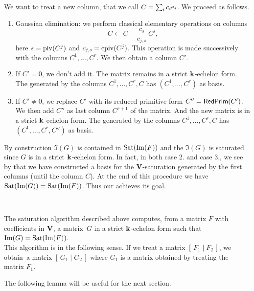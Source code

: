 We want to treat a new  column, that we call $C=\sum_i c_i\mathrm{e}_i$.
We proceed as follows.
%
\begin{enumerate}
%
\item  Gaussian elimination:  we perform classical elementary operations on  columns
  $$
  C\leftarrow C- \frac{c_s}{c_{j,s}}\,C^j,
  $$
here $s=\mathrm{piv}(C^j)$
and $c_{j,s}=\mathrm{cpiv}(C^j)$.
This operation is made  successively with the columns $C^1,\dots,C^r$.
We then obtain a column $C'$.
%
\item If $C'=0$, we don't add it.
The matrix remains in a strict   $\mathbf{k}$-echelon form.
The \Kev generated by the columns $C^1,\dots,C^r,C$ has $(C^1,\dots,C^r)$ as basis.
%
\item If $C'\neq 0$, we replace $C'$ with its reduced primitive form
$C''=\mathsf{RedPrim}(C')$. We then add $C''$ as last  column $C^{r+1}$ of the matrix.
And the new matrix is in a strict  $\mathbf{k}$-echelon form.
The  \Kev generated by the columns $C^1,\dots,C^r,C$ has
$(C^1,\dots,C^r,C'')$ as basis.
%
\end{enumerate}

By construction $\Im(G)$ is contained in  $\mathrm{Sat}(\mathrm{Im}(F))$ and the \Vmo $\Im(G)$ is saturated since $G$ is in a strict $\mathbf{k}$-echelon form.
In fact, in both case 2. and case 3., we see by \recu that we have constructed  a basis for the $\mathbf{V}$-saturation generated by the first  columns (until the column $C$). At the end of this procedure we  have  $\mathrm{Sat}(\mathrm{Im}(G))=\mathrm{Sat}(\mathrm{Im}(F))$.
Thus our \algo achieves its goal.

\begin{theorem} \label{thAlgoSat}~

\noindent The saturation algorithm described above computes, from a matrix   $F$ with coefficients in $\mathbf{V}$, a matrix~$G$  in a strict $\mathbf{k}$-echelon form such that  $\mathrm{Im}(G)=\mathrm{Sat}(\mathrm{Im}(F))$.
\\
This algorithm is   in the following sense. If we treat a matrix
$[\,F_1\mid F_2\,]$, we obtain~a  matrix $[\,G_1\mid G_2\,]$ where $G_1$
is a matrix obtained by treating the  matrix $F_1$.
\end{theorem}



\medskip
The following lemma will be useful for the next section.

